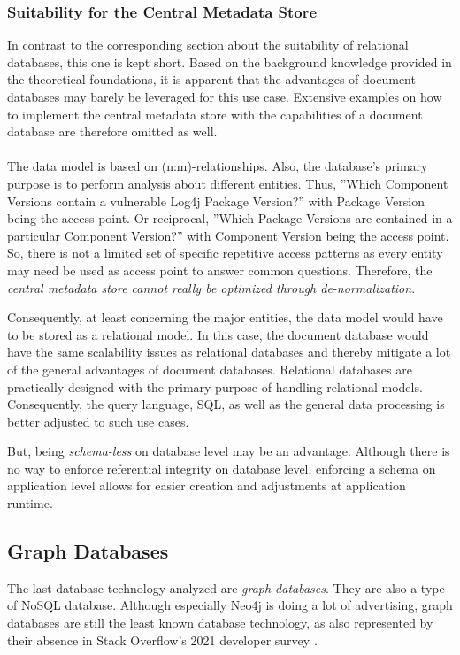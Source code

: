 \subsubsection{Suitability for the Central Metadata Store}
In contrast to the corresponding section about the suitability of relational databases, this one is kept short. Based on the background knowledge provided in the theoretical foundations, it is apparent that the advantages of document databases may barely be leveraged for this use case. Extensive examples on how to implement the central metadata store with the capabilities of a document database are therefore omitted as well.\\\\ 
The data model is based on (n:m)-relationships. Also, the database's primary purpose is to perform analysis about different entities. Thus, ''Which Component Versions contain a vulnerable Log4j Package Version?'' with Package Version being the access point. Or reciprocal, ''Which Package Versions are contained in a particular Component Version?'' with Component Version being the access point. So, there is not a limited set of specific repetitive access patterns as every entity may need be used as access point to answer common questions. Therefore, the \emph{central metadata store cannot really be optimized through de-normalization}.\par
Consequently, at least concerning the major entities, the data model would have to be stored as a relational model. In this case, the document database would have the same scalability issues as relational databases and thereby mitigate a lot of the general advantages of document databases. Relational databases are practically designed with the primary purpose of handling relational models. Consequently, the query language, SQL, as well as the general data processing is better adjusted to such use cases.\par 
But, being \emph{schema-less} on database level may be an advantage. Although there is no way to enforce referential integrity on database level, enforcing a schema on application level allows for easier creation and adjustments at application runtime.

\subsection{Graph Databases}
The last database technology analyzed are \emph{graph databases}. They are also a type of NoSQL database. Although especially Neo4j is doing a lot of advertising, graph databases are still the least known database technology, as also represented by their absence in Stack Overflow's 2021 developer survey \cite{StackoverflowDeveloperSurvey}.

